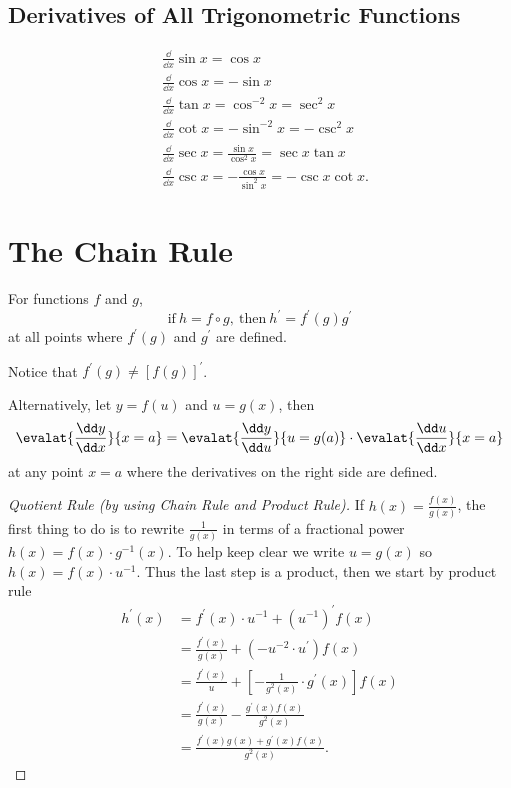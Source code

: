 \subsection{Derivatives of All Trigonometric Functions}
\begin{align*}
  & \frac\dd{\dd x}\sin x=\cos x\\
  & \frac\dd{\dd x}\cos x=-\sin x\\
  & \frac\dd{\dd x}\tan x=\cos^{-2}x=\sec^2 x\\
  & \frac\dd{\dd x}\cot x=-\sin^{-2}x=-\csc^2 x\\
  & \frac\dd{\dd x}\sec x=\frac{\sin x}{\cos^2 x}=\sec x\tan x\\
  & \frac\dd{\dd x}\csc x=-\frac{\cos x}{\sin^2 x}=-\csc x\cot x.
\end{align*}

\section{The Chain Rule}
For functions $f$ and $g$,
\[\text{if}\ h=f\circ g,\ \text{then}\ h^\prime=f^\prime(g)g^\prime\]
at all points where $f^\prime(g)$ and $g^\prime$ are defined.
\begin{note}Notice that $f^\prime(g)\neq[f(g)]^\prime $.\end{note}
Alternatively, let $y=f(u)$ and $u=g(x)$, then
\[
  \evalat{\frac{\dd y}{\dd x}}{x=a}=\evalat{\frac{\dd y}{\dd u}}{u=g(a)}\cdot\evalat{\frac{\dd u}{\dd x}}{x=a}
\]
at any point $x=a$ where the derivatives on the right side are defined.
\begin{proof}[Quotient Rule (by using Chain Rule and Product Rule)]
If \(h(x)=\frac{f(x)}{g(x)}\), the first thing to do is to rewrite \(\frac{1}{g(x)}\) in terms of a fractional power \(h(x)=f(x)\cdot g^{-1}(x)\). To help keep clear we write \(u=g(x)\) so \(h(x)=f(x)\cdot u^{-1}\). Thus the last step is a product, then we start by product rule
    \begin{align*}
        h^\prime (x) & =f^\prime (x)\cdot u^{-1}+(u^{-1})^\prime f(x)\\
                     & =\frac{f^\prime (x)}{g(x)}+(-u^{-2}\cdot u^\prime)f(x)\\
                     & =\frac{f^\prime (x)}{u}+[-\frac{1}{g^2(x)}\cdot g^\prime (x)]f(x)\\
                     & =\frac{f^\prime (x)}{g(x)}-\frac{g^\prime (x)f(x)}{g^2(x)}\\
                     & =\frac{f^\prime (x)g(x)+g^\prime (x)f(x)}{g^2(x)}.
    \end{align*}
\end{proof}

